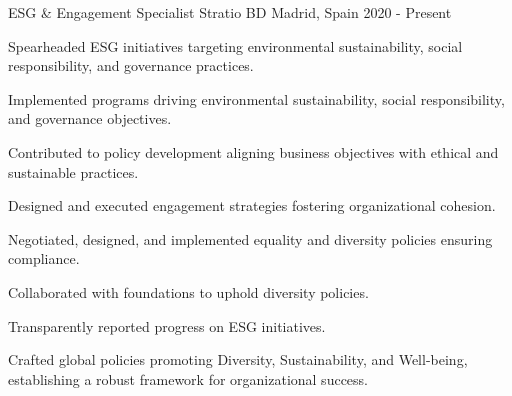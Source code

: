 

\begin{cventries}

  \cventry
    {ESG \& Engagement Specialist} %
    {Stratio BD} %
    {Madrid, Spain} %
    {2020 - Present} %
    {
      \begin{cvitems} %
        \item {Spearheaded ESG initiatives targeting environmental sustainability, social responsibility, and governance practices.}
        \item {Implemented programs driving environmental sustainability, social responsibility, and governance objectives.}
        \item {Contributed to policy development aligning business objectives with ethical and sustainable practices.}
        \item {Designed and executed engagement strategies fostering organizational cohesion.}
        \item {Negotiated, designed, and implemented equality and diversity policies ensuring compliance.}
        \item {Collaborated with foundations to uphold diversity policies.}
        \item {Transparently reported progress on ESG initiatives.  }
        \item {Crafted global policies promoting Diversity, Sustainability, and Well-being, establishing a robust framework for organizational success.}
      \end{cvitems}
    }


\end{cventries}
